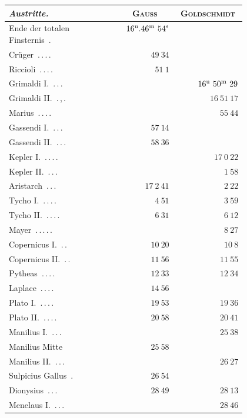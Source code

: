 \clearpage
\begin{center}\begingroup\fontsize{10}{12}\selectfont\setlength{\tabcolsep}{5pt}
\begin{tabular}{@{}p{0.47\linewidth}|r|r@{}}
\emph{Austritte.} & \multicolumn{1}{c|}{\textsc{Gauss}} & \multicolumn{1}{c}{\textsc{Goldschmidt}}\\\hline
Ende der totalen Finsternis\ \mbox{.} & $16^{\rm u}.46^{\rm m}\ 54^{\rm s}$ & \\
Crüger\ \mbox{.\,.\,.\,.} & $49\ 34$ & \\
Riccioli\ \mbox{.\,.\,.\,.} & $51\ 1$ & \\
Grimaldi I.\ \mbox{.\,.\,.} &  & $16^{\rm u}\ 50^{\rm m}\ 29$\\
Grimaldi II.\ \mbox{.\,,\,.} &  & $16\ 51\ 17$\\
Marius\ \mbox{.\,.\,.\,.} &  & $55\ 44$\\
Gassendi I.\ \mbox{.\,.\,.} & $57\ 14$ & \\
Gassendi II.\ \mbox{.\,.\,.} & $58\ 36$ & \\
Kepler I.\ \mbox{.\,.\,.\,.} &  & $17\ 0\ 22$\\
Kepler II.\ \mbox{.\,.\,.} &  & $1\ 58$\\
Aristarch\ \mbox{.\,.\,.} & $17\ 2\ 41$ & $2\ 22$\\
Tycho I.\ \mbox{.\,.\,.\,.} & $4\ 51$ & $3\ 59$\\
Tycho II.\ \mbox{.\,.\,.\,.} & $6\ 31$ & $6\ 12$\\
Mayer\ \mbox{.\,.\,.\,.\,.} &  & $8\ 27$\\
Copernicus I.\ \mbox{.\,.} & $10\ 20$ & $10\ 8$\\
Copernicus II.\ \mbox{.\,.} & $11\ 56$ & $11\ 55$\\
Pytheas\ \mbox{.\,.\,.\,.} & $12\ 33$ & $12\ 34$\\
Laplace\ \mbox{.\,.\,.\,.} & $14\ 56$ & \\
Plato I.\ \mbox{.\,.\,.\,.} & $19\ 53$ & $19\ 36$\\
Plato II.\ \mbox{.\,.\,.\,.} & $20\ 58$ & $20\ 41$\\
Manilius I.\ \mbox{.\,.\,.} &  & $25\ 38$\\
Manilius Mitte & $25\ 58$ & \\
Manilius II.\ \mbox{.\,.\,.} &  & $26\ 27$\\
Sulpicius Gallus\ \mbox{.} & $26\ 54$ & \\
Dionysius\ \mbox{.\,.\,.} & $28\ 49$ & $28\ 13$\\
Menelaus I.\ \mbox{.\,.\,.} &  & $28\ 46$\\

\end{tabular}
\end{center}
